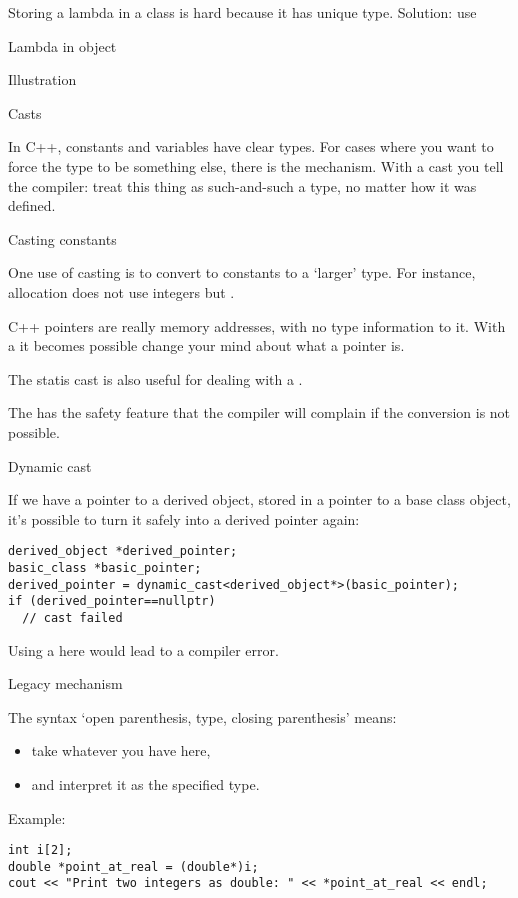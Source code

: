 Storing a lambda in a class is hard because it has unique
type. Solution: use 

\begin{block}{Lambda in object}
  \label{sl:lambda-class}
\end{block}

\begin{block}{Illustration}
  \label{sl:lambda-classed}
\end{block}

 {Casts}
\label{sec:cast}

In C++, constants and variables have clear types. For cases where you
want to force the type to be something else, there is the
 mechanism. With a cast you tell the compiler:
treat this thing as such-and-such a type, no matter how it was
defined.

 {Casting constants}

One use of casting is to convert to constants to a `larger' type. For
instance, allocation does not use integers but .


C++ pointers are really memory addresses, with no type information to it.
With a  it becomes possible change your mind about
what a pointer is.

The statis cast is also useful for dealing with a .

The  has the safety feature that the compiler
will complain if the conversion is not possible.

 {Dynamic cast}

If we have a pointer to a derived object, stored in a pointer to a
base class object, it's possible to turn it safely into a derived
pointer again:
\begin{verbatim}
derived_object *derived_pointer;
basic_class *basic_pointer;
derived_pointer = dynamic_cast<derived_object*>(basic_pointer);
if (derived_pointer==nullptr)
  // cast failed
\end{verbatim}

Using a  here would lead to a compiler error.

 {Legacy mechanism}

The syntax `open parenthesis, type, closing parenthesis' means:
\begin{itemize}
\item take whatever you have here,
\item and interpret it as the specified type.
\end{itemize}
Example:
\begin{verbatim}
int i[2];
double *point_at_real = (double*)i;
cout << "Print two integers as double: " << *point_at_real << endl;
\end{verbatim}


